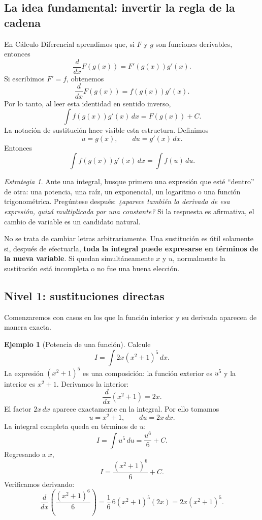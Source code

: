 \documentclass[12pt]{article}
\theoremstyle{definition}
\newtheorem{ejemplo}[teorema]{Ejemplo}
\theoremstyle{remark}
\newtheorem*{estrategia}{Estrategia}
\begin{document}
\subsection*{La idea fundamental: invertir la regla de la cadena}

En Cálculo Diferencial aprendimos que, si $F$ y $g$ son funciones derivables, entonces
\[
\frac{d}{dx}F(g(x))=F'(g(x))g'(x).
\]
Si escribimos $F'=f$, obtenemos
\[
\frac{d}{dx}F(g(x))=f(g(x))g'(x).
\]
Por lo tanto, al leer esta identidad en sentido inverso,
\[
\boxed{\int f(g(x))g'(x)\,dx=F(g(x))+C.}
\]
La notación de sustitución hace visible esta estructura. Definimos
\[
u=g(x),\qquad du=g'(x)\,dx.
\]
Entonces
\[
\boxed{\int f(g(x))g'(x)\,dx=\int f(u)\,du.}
\]

\begin{estrategia}
Ante una integral, busque primero una expresión que esté ``dentro'' de otra: una potencia, una raíz, un exponencial, un logaritmo o una función trigonométrica. Pregúntese después: \emph{¿aparece también la derivada de esa expresión, quizá multiplicada por una constante?} Si la respuesta es afirmativa, el cambio de variable es un candidato natural.
\end{estrategia}

No se trata de cambiar letras arbitrariamente. Una sustitución es útil solamente si, después de efectuarla, \textbf{toda la integral puede expresarse en términos de la nueva variable}. Si quedan simultáneamente $x$ y $u$, normalmente la sustitución está incompleta o no fue una buena elección.

\subsection*{Nivel 1: sustituciones directas}

Comenzaremos con casos en los que la función interior y su derivada aparecen de manera exacta.

\begin{ejemplo}[Potencia de una función]
Calcule
\[
I=\int 2x(x^2+1)^5\,dx.
\]
La expresión $(x^2+1)^5$ es una composición: la función exterior es $u^5$ y la interior es $x^2+1$. Derivamos la interior:
\[
\frac{d}{dx}(x^2+1)=2x.
\]
El factor $2x\,dx$ aparece exactamente en la integral. Por ello tomamos
\[
u=x^2+1,\qquad du=2x\,dx.
\]
La integral completa queda en términos de $u$:
\[
I=\int u^5\,du=\frac{u^6}{6}+C.
\]
Regresando a $x$,
\[
\boxed{I=\frac{(x^2+1)^6}{6}+C.}
\]
Verificamos derivando:
\[
\frac{d}{dx}\left(\frac{(x^2+1)^6}{6}\right)
=\frac16\,6(x^2+1)^5(2x)=2x(x^2+1)^5.
\]
\end{ejemplo}
\end{document}
